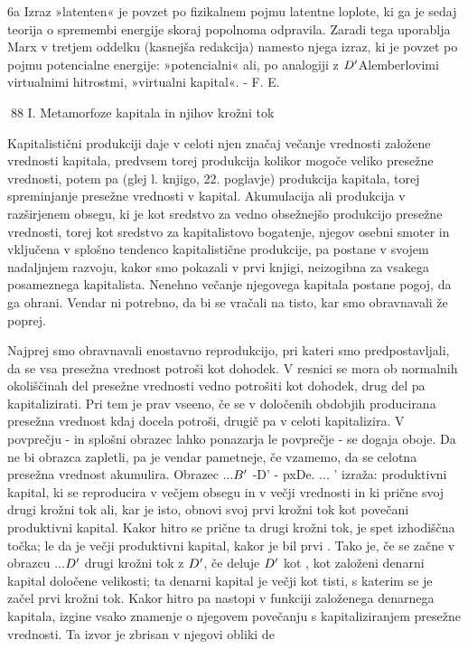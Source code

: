 \documentclass[kapital_02.tex]{subfiles}
\begin{document}
 6a Izraz »latenten« je povzet po fizikalnem pojmu latentne loplote, ki ga je sedaj teorija o spremembi energije skoraj popolnoma odpravila. Zaradi tega uporablja Marx v tretjem oddelku (kasnejša redakcija) namesto njega izraz, ki je povzet po pojmu potencialne energije: »potencialni« ali, po analogiji z \( D' \)Alemberlovimi virtualnimi hitrostmi, »virtualni kapital«. - F. E.



88 I. Metamorfoze kapitala in njihov krožni tok



 Kapitalistični produkciji daje v celoti njen značaj večanje vrednosti založene vrednosti kapitala, predvsem torej produkcija kolikor mogoče veliko presežne vrednosti, potem pa (glej l. knjigo, 22. poglavje) produkcija kapitala, torej spreminjanje presežne vrednosti v kapital. Akumulacija ali produkcija v razširjenem obsegu, ki je kot sredstvo za vedno obsežnejšo produkcijo presežne vrednosti, torej kot sredstvo za kapitalistovo bogatenje, njegov osebni smoter in vključena v splošno tendenco kapitalistične produkcije, pa postane v svojem nadaljnjem razvoju, kakor smo pokazali v prvi knjigi, neizogibna za vsakega posameznega kapitalista. Nenehno večanje njegovega kapitala postane pogoj, da ga ohrani. Vendar ni potrebno, da bi se vračali na tisto, kar smo obravnavali že poprej.

Najprej smo obravnavali enostavno reprodukcijo, pri kateri smo predpostavljali, da se vsa presežna vrednost potroši kot dohodek. V resnici se mora ob normalnih okoliščinah del presežne vrednosti vedno potrošiti kot dohodek, drug del pa kapitalizirati. Pri tem je prav vseeno, če se v določenih obdobjih producirana presežna vrednost kdaj docela potroši, drugič pa v celoti kapitalizira. V povprečju - in splošni obrazec lahko ponazarja le povprečje - se dogaja oboje. Da ne bi obrazca zapletli, pa je vendar pametneje, če vzamemo, da se celotna presežna vrednost akumulira. Obrazec \KPEP...\( B' \) -D' - pxDe. ... \KPEP' izraža: produktivni kapital, ki se reproducira v večjem obsegu in v večji vrednosti in ki prične svoj drugi krožni tok ali, kar je isto, obnovi svoj prvi krožni tok kot povečani produktivni kapital. Kakor hitro se prične ta drugi krožni tok, je \KPEP spet izhodiščna točka; le da je \KPEP večji produktivni kapital, kakor je bil prvi \KPEP. Tako je, če se začne v obrazcu \KPED...\( D' \) drugi krožni tok z \( D' \), če deluje \( D' \) kot \KPED, kot založeni denarni kapital določene velikosti; ta denarni kapital je večji kot tisti, s katerim se je začel prvi krožni tok. Kakor hitro pa nastopi v funkciji založenega denarnega kapitala, izgine vsako znamenje o njegovem povečanju s kapitaliziranjem presežne vrednosti. Ta izvor je zbrisan v njegovi obliki de
\end{document}
